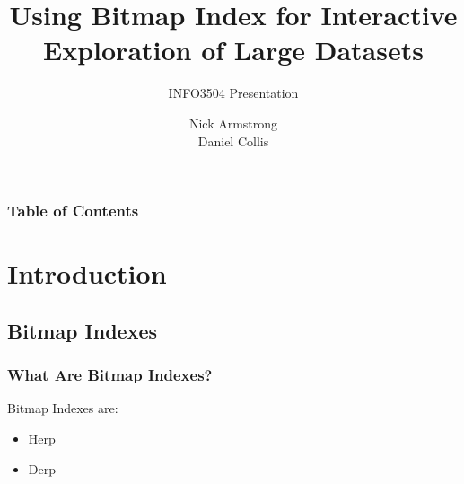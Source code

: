 \documentclass[11pt]{beamer}
\title[Bitmap Indexes for Large Datasets]{\textbf{Using Bitmap Index for Interactive Exploration of Large Datasets}}
\subtitle{INFO3504 Presentation}
\author{Nick Armstrong \\
        Daniel Collis}
\institute{University of Sydney}
\date{}
\begin{document}
\frame{\titlepage}

\begin{frame}
	\frametitle{Table of Contents}
	\tableofcontents
\end{frame}

\section{Introduction}

\subsection[Subsection]{Bitmap Indexes}

\begin{frame}
	\frametitle{What Are Bitmap Indexes?}
	
	Bitmap Indexes are:
	\begin{itemize}
		\pause
		\item Herp
		\pause
		\item Derp
	\end{itemize}
\end{frame}
\end{document}
